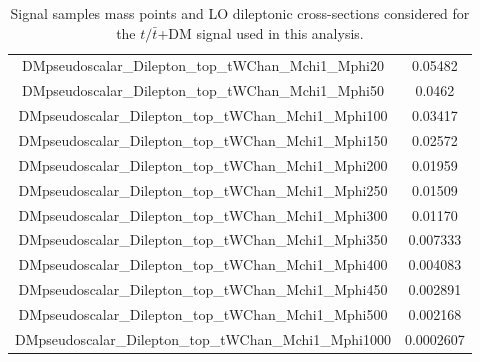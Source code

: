 \documentclass[a4paper, 10pt, openright]{report}
\begin{document}
\begin{appendices}
\begin{table}
\begin{center}
\begin{tabular}{ c|c }
 DMpseudoscalar\_Dilepton\_top\_tWChan\_Mchi1\_Mphi20 & 0.05482 \\
 DMpseudoscalar\_Dilepton\_top\_tWChan\_Mchi1\_Mphi50 & 0.0462 \\
 DMpseudoscalar\_Dilepton\_top\_tWChan\_Mchi1\_Mphi100 & 0.03417 \\
 DMpseudoscalar\_Dilepton\_top\_tWChan\_Mchi1\_Mphi150 & 0.02572 \\
 DMpseudoscalar\_Dilepton\_top\_tWChan\_Mchi1\_Mphi200 & 0.01959 \\
 DMpseudoscalar\_Dilepton\_top\_tWChan\_Mchi1\_Mphi250 & 0.01509 \\
 DMpseudoscalar\_Dilepton\_top\_tWChan\_Mchi1\_Mphi300 & 0.01170 \\
 DMpseudoscalar\_Dilepton\_top\_tWChan\_Mchi1\_Mphi350 & 0.007333 \\
 DMpseudoscalar\_Dilepton\_top\_tWChan\_Mchi1\_Mphi400 & 0.004083 \\
 DMpseudoscalar\_Dilepton\_top\_tWChan\_Mchi1\_Mphi450 & 0.002891 \\
 DMpseudoscalar\_Dilepton\_top\_tWChan\_Mchi1\_Mphi500 & 0.002168 \\
 DMpseudoscalar\_Dilepton\_top\_tWChan\_Mchi1\_Mphi1000 & 0.0002607 \\
 \hline
\end{tabular}
\caption{Signal samples mass points and \ac{LO} dileptonic cross-sections considered for the $t/ \bar t$+DM signal used in this analysis.}
\label{table:tDMsignals}
\end{center}
\end{table}


\end{appendices}
\end{document}
